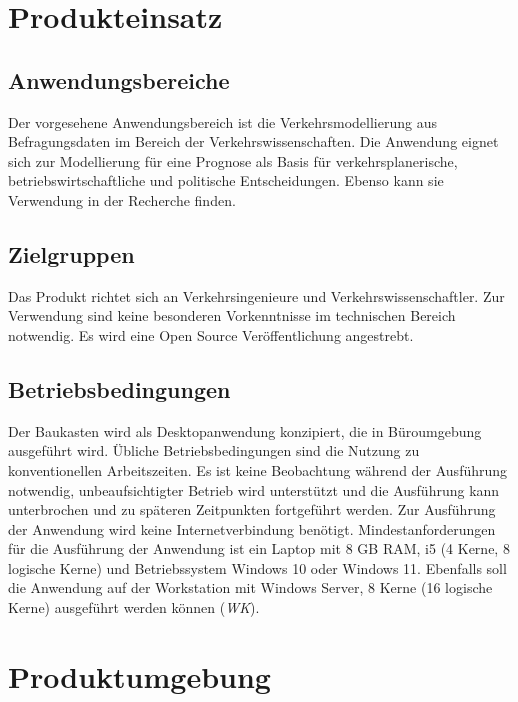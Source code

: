 \documentclass{article}
\begin{document}

\newpage
\section{Produkteinsatz}
\subsection{Anwendungsbereiche}
Der vorgesehene Anwendungsbereich ist die Verkehrsmodellierung aus Befragungsdaten im Bereich der Verkehrswissenschaften. Die Anwendung eignet sich zur Modellierung für eine Prognose als Basis für verkehrsplanerische, betriebswirtschaftliche und politische Entscheidungen. Ebenso kann sie Verwendung in der Recherche finden.

\subsection{Zielgruppen}
Das Produkt richtet sich an Verkehrsingenieure und Verkehrswissenschaftler. Zur Verwendung sind keine besonderen Vorkenntnisse im technischen Bereich notwendig.\newline 
Es wird eine Open Source Veröffentlichung angestrebt.
  
\subsection{Betriebsbedingungen}
Der Baukasten wird als Desktopanwendung konzipiert, die in Büroumgebung ausgeführt wird. Übliche Betriebsbedingungen sind die Nutzung zu konventionellen Arbeitszeiten. Es ist keine Beobachtung während der Ausführung notwendig, unbeaufsichtigter Betrieb wird unterstützt und die Ausführung kann unterbrochen und zu späteren Zeitpunkten fortgeführt werden. Zur Ausführung der Anwendung wird keine Internetverbindung benötigt.
Mindestanforderungen für die Ausführung der Anwendung ist ein Laptop mit 8 GB RAM, i5 (4 Kerne, 8 logische Kerne) und Betriebssystem Windows 10 oder Windows 11. Ebenfalls soll die Anwendung auf der Workstation mit Windows Server, 8 Kerne (16 logische Kerne) ausgeführt werden können (\textit{WK}).
\newpage

\section{Produktumgebung}
\end{document}
